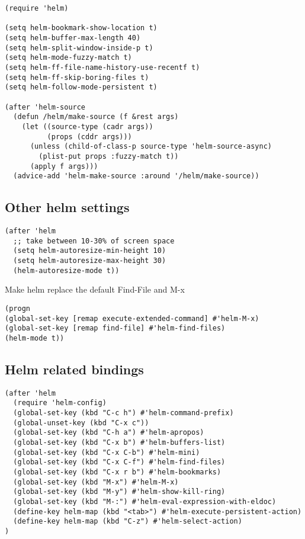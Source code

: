 \documentclass[11pt]{article}
\begin{document}
\begin{verbatim}
(require 'helm)

(setq helm-bookmark-show-location t)
(setq helm-buffer-max-length 40)
(setq helm-split-window-inside-p t)
(setq helm-mode-fuzzy-match t)
(setq helm-ff-file-name-history-use-recentf t)
(setq helm-ff-skip-boring-files t)
(setq helm-follow-mode-persistent t)

(after 'helm-source
  (defun /helm/make-source (f &rest args)
    (let ((source-type (cadr args))
          (props (cddr args)))
      (unless (child-of-class-p source-type 'helm-source-async)
        (plist-put props :fuzzy-match t))
      (apply f args)))
  (advice-add 'helm-make-source :around '/helm/make-source))
\end{verbatim}


\subsection*{Other helm settings}
\label{sec:orgabb377f}

\begin{verbatim}
(after 'helm
  ;; take between 10-30% of screen space
  (setq helm-autoresize-min-height 10)
  (setq helm-autoresize-max-height 30)
  (helm-autoresize-mode t))
\end{verbatim}

Make helm replace the default Find-File and M-x

\begin{verbatim}
(progn
(global-set-key [remap execute-extended-command] #'helm-M-x)
(global-set-key [remap find-file] #'helm-find-files)
(helm-mode t))
\end{verbatim}

\subsection*{Helm related bindings}
\label{sec:orgd442af2}

\begin{verbatim}
(after 'helm
  (require 'helm-config)
  (global-set-key (kbd "C-c h") #'helm-command-prefix)
  (global-unset-key (kbd "C-x c"))
  (global-set-key (kbd "C-h a") #'helm-apropos)
  (global-set-key (kbd "C-x b") #'helm-buffers-list)
  (global-set-key (kbd "C-x C-b") #'helm-mini)
  (global-set-key (kbd "C-x C-f") #'helm-find-files)
  (global-set-key (kbd "C-x r b") #'helm-bookmarks)
  (global-set-key (kbd "M-x") #'helm-M-x)
  (global-set-key (kbd "M-y") #'helm-show-kill-ring)
  (global-set-key (kbd "M-:") #'helm-eval-expression-with-eldoc)
  (define-key helm-map (kbd "<tab>") #'helm-execute-persistent-action)
  (define-key helm-map (kbd "C-z") #'helm-select-action)
)
\end{verbatim}
\end{document}
